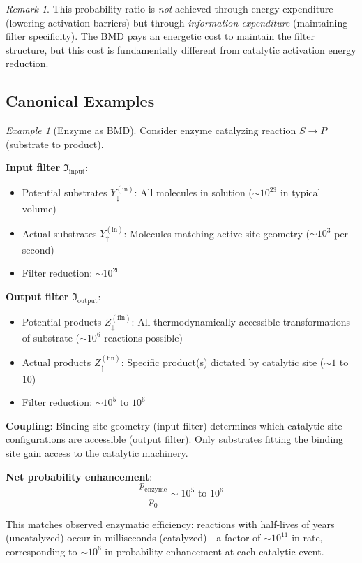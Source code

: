 \documentclass[11pt]{article}
\theoremstyle{remark}
\newtheorem{remark}[theorem]{Remark}
\newtheorem{example}[theorem]{Example}
\begin{document}
\begin{remark}
This probability ratio is \textit{not} achieved through energy expenditure (lowering activation barriers) but through \textit{information expenditure} (maintaining filter specificity). The BMD pays an energetic cost to maintain the filter structure, but this cost is fundamentally different from catalytic activation energy reduction.
\end{remark}

\subsection{Canonical Examples}

\begin{example}[Enzyme as BMD]
\label{ex:enzyme_bmd}
Consider enzyme catalyzing reaction $S \to P$ (substrate to product).

\textbf{Input filter} $\Im_{\text{input}}$:
\begin{itemize}
\item Potential substrates $Y_{\downarrow}^{(\text{in})}$: All molecules in solution ($\sim 10^{23}$ in typical volume)
\item Actual substrates $Y_{\uparrow}^{(\text{in})}$: Molecules matching active site geometry ($\sim 10^3$ per second)
\item Filter reduction: $\sim 10^{20}$
\end{itemize}

\textbf{Output filter} $\Im_{\text{output}}$:
\begin{itemize}
\item Potential products $Z_{\downarrow}^{(\text{fin})}$: All thermodynamically accessible transformations of substrate ($\sim 10^6$ reactions possible)
\item Actual products $Z_{\uparrow}^{(\text{fin})}$: Specific product(s) dictated by catalytic site ($\sim 1$ to $10$)
\item Filter reduction: $\sim 10^5$ to $10^6$
\end{itemize}

\textbf{Coupling}: Binding site geometry (input filter) determines which catalytic site configurations are accessible (output filter). Only substrates fitting the binding site gain access to the catalytic machinery.

\textbf{Net probability enhancement}:
\begin{equation}
\frac{p_{\text{enzyme}}}{p_0} \sim 10^5 \text{ to } 10^6
\end{equation}

This matches observed enzymatic efficiency: reactions with half-lives of years (uncatalyzed) occur in milliseconds (catalyzed)—a factor of $\sim 10^{11}$ in rate, corresponding to $\sim 10^{6}$ in probability enhancement at each catalytic event.
\end{example}
\end{document}

